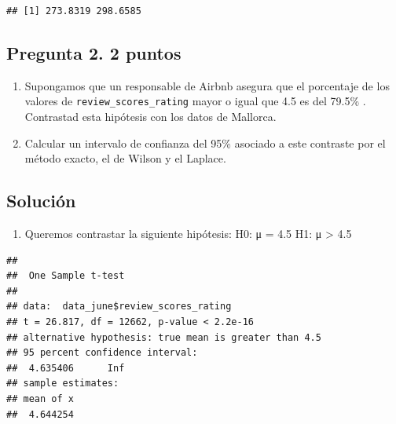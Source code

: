 \documentclass[
]{article}
\newenvironment{Shaded}{\begin{snugshade}}{\end{snugshade}}
\newcommand{\AttributeTok}[1]{\textcolor[rgb]{0.77,0.63,0.00}{#1}}
\newcommand{\DocumentationTok}[1]{\textcolor[rgb]{0.56,0.35,0.01}{\textbf{\textit{#1}}}}
\newcommand{\FloatTok}[1]{\textcolor[rgb]{0.00,0.00,0.81}{#1}}
\newcommand{\FunctionTok}[1]{\textcolor[rgb]{0.00,0.00,0.00}{#1}}
\newcommand{\NormalTok}[1]{#1}
\newcommand{\OtherTok}[1]{\textcolor[rgb]{0.56,0.35,0.01}{#1}}
\newcommand{\SpecialCharTok}[1]{\textcolor[rgb]{0.00,0.00,0.00}{#1}}
\newcommand{\StringTok}[1]{\textcolor[rgb]{0.31,0.60,0.02}{#1}}
\providecommand{\tightlist}{%
  \setlength{\itemsep}{0pt}\setlength{\parskip}{0pt}}
\begin{document}
\begin{verbatim}
## [1] 273.8319 298.6585
\end{verbatim}

\hypertarget{pregunta-2.-2-puntos}{%
\subsection{\texorpdfstring{Pregunta 2. \textbf{2
puntos}}{Pregunta 2. 2 puntos}}\label{pregunta-2.-2-puntos}}

\begin{enumerate}
\def\labelenumi{\alph{enumi}.}
\tightlist
\item
  Supongamos que un responsable de Airbnb asegura que el porcentaje de
  los valores de \texttt{review\_scores\_rating} mayor o igual que 4.5
  es del 79.5\% . Contrastad esta hipótesis con los datos de Mallorca.
\item
  Calcular un intervalo de confianza del 95\% asociado a este contraste
  por el método exacto, el de Wilson y el Laplace.
\end{enumerate}

\hypertarget{soluciuxf3n-1}{%
\subsection{Solución}\label{soluciuxf3n-1}}

\begin{enumerate}
\def\labelenumi{\alph{enumi})}
\tightlist
\item
  Queremos contrastar la siguiente hipótesis: H0: μ = 4.5 H1: μ
  \textgreater{} 4.5
\end{enumerate}

\begin{Shaded}
\end{Shaded}

\begin{verbatim}
## 
##  One Sample t-test
## 
## data:  data_june$review_scores_rating
## t = 26.817, df = 12662, p-value < 2.2e-16
## alternative hypothesis: true mean is greater than 4.5
## 95 percent confidence interval:
##  4.635406      Inf
## sample estimates:
## mean of x 
##  4.644254
\end{verbatim}
\end{document}
